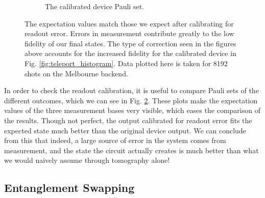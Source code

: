 \begin{figure}[h!]
\begin{subfigure}{.5\textwidth}
    \caption{The calibrated device Pauli set.}
    \label{fig:tele_pauli_dev}
  \end{subfigure}
  \caption{The expectation values match those we expect after calibrating for
readout error. Errors in measurement contribute greatly to the low fidelity of
our final states. The type of correction seen in the figures above accounts for
the increased fidelity for the calibrated device in Fig.
\ref{fig:teleport_histogram}. Data plotted here is taken for 8192 shots on the
Melbourne backend.}
  \label{fig:tele_paulis}
\end{figure}
In order to check the readout calibration, it is useful to compare Pauli sets of
the different outcomes, which we can see in Fig. \ref{fig:tele_paulis}. These
plots make the expectation values of the three measurement bases very visible,
which eases the comparison of the results. Though not perfect, the output
calibrated for readout error fits the expected state much better than the
original device output. We can conclude from this that indeed, a large source of
error in the system comes from measurement, and the state the circuit actually
creates is much better than what we would naively assume through tomography
alone!


\subsection{Entanglement Swapping}

